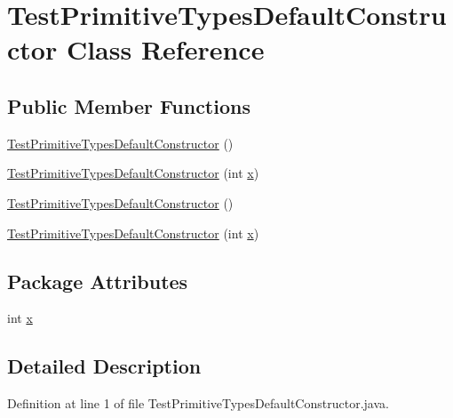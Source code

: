 \hypertarget{classTestPrimitiveTypesDefaultConstructor}{
\section{TestPrimitiveTypesDefaultConstructor Class Reference}
\label{classTestPrimitiveTypesDefaultConstructor}
}
\subsection*{Public Member Functions}
\begin{DoxyCompactItemize}
\item 
\hyperlink{classTestPrimitiveTypesDefaultConstructor_ad23a23455bce7cd752cbf8ec16e30145}{TestPrimitiveTypesDefaultConstructor} ()
\item 
\hyperlink{classTestPrimitiveTypesDefaultConstructor_abbcd8452c13c3295ab580b77496328c9}{TestPrimitiveTypesDefaultConstructor} (int \hyperlink{classTestPrimitiveTypesDefaultConstructor_a43889556e2c894f3ed7e6ed88bee44df}{x})
\item 
\hyperlink{classTestPrimitiveTypesDefaultConstructor_ad23a23455bce7cd752cbf8ec16e30145}{TestPrimitiveTypesDefaultConstructor} ()
\item 
\hyperlink{classTestPrimitiveTypesDefaultConstructor_abbcd8452c13c3295ab580b77496328c9}{TestPrimitiveTypesDefaultConstructor} (int \hyperlink{classTestPrimitiveTypesDefaultConstructor_a43889556e2c894f3ed7e6ed88bee44df}{x})
\end{DoxyCompactItemize}
\subsection*{Package Attributes}
\begin{DoxyCompactItemize}
\item 
int \hyperlink{classTestPrimitiveTypesDefaultConstructor_a43889556e2c894f3ed7e6ed88bee44df}{x}
\end{DoxyCompactItemize}


\subsection{Detailed Description}


Definition at line 1 of file TestPrimitiveTypesDefaultConstructor.java.



